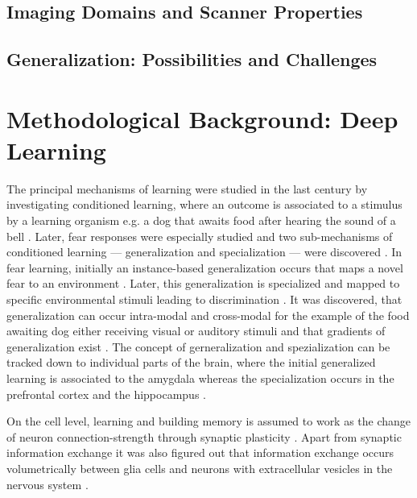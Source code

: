     \subsection{Imaging Domains and Scanner Properties} %

    \subsection{Generalization: Possibilities and Challenges} %

\section{Methodological Background: Deep Learning} %
    The principal mechanisms of learning were studied in the last century by investigating conditioned learning, where an outcome is associated to a stimulus by a learning organism e.g. a dog that awaits food after hearing the sound of a bell \citep{pavlov1928conditioned, pavlov2010conditioned, banich2011generalization}. Later, fear responses were especially studied and two sub-mechanisms of conditioned learning --- generalization and specialization --- were discovered \citep{banich2011generalization}.
    In fear learning, initially an instance-based generalization occurs that maps a novel fear to an environment \citep{banich2011generalization}. Later, this generalization is specialized and mapped to specific environmental stimuli leading to discrimination \citep{banich2011generalization}.
    It was discovered, that generalization can occur intra-modal and cross-modal for the example of the food awaiting dog either receiving visual or auditory stimuli \citep{pavlov1928conditioned} and that gradients of generalization exist \citep{guttman1956discriminability}.
    The concept of gerneralization and spezialization can be tracked down to individual parts of the brain, where the initial generalized learning is associated to the amygdala whereas the specialization occurs in the prefrontal cortex and the hippocampus \citep{banich2011generalization}.

    On the cell level, learning and building memory is assumed to work as the change of neuron connection-strength through synaptic plasticity \citep{do1949organization,martin2000synaptic}. Apart from synaptic information exchange it was also figured out that information exchange occurs volumetrically between glia cells and neurons with extracellular vesicles in the nervous system \citep{schiera2019communcation}.

